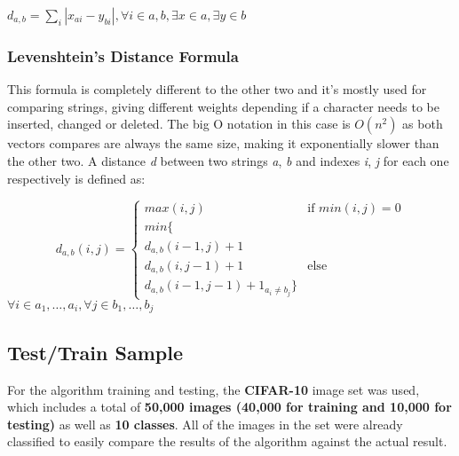 \documentclass[conference,compsoc]{IEEEtran}
\begin{document}
\vspace{3mm}
\(d_{a,b} = \sum_{i} |x_{ai} - y_{bi}|,  \forall i \in a,b, \exists x \in a, \exists y \in b \)

\subsubsection{Levenshtein's Distance Formula}
This formula is completely different to the other two and it's mostly used for comparing strings, giving different weights depending if a character needs to be inserted, changed or deleted. The big O notation in this case is $O(n^2)$ as both vectors compares are always the same size, making it exponentially slower than the other two. A distance \textit{d} between two strings \textit{a}, \textit{b} and indexes \textit{i}, \textit{j} for each one respectively is defined as:


\[ d_{a,b}(i, j) =
  \begin{cases}
    max(i, j)       & \text{if } min(i, j) = 0\\
    min \{ \\ d_{a,b}(i-1, j) + 1 \\  d_{a,b}(i, j-1) + 1 & \text{else} \\ d_{a,b}(i-1, j-1) + 1_{a_i \neq b_j}  \}
  \end{cases}
\]
\(\forall i \in a_1, \dotsc, a_i, \forall j \in b_1, \dotsc, b_j\)

\subsection{Test/Train Sample}
For the algorithm training and testing, the \textbf{CIFAR-10} image set was used, which includes a total of \textbf{50,000 images (40,000 for training and 10,000 for testing)} as well as \textbf{10 classes}. All of the images in the set were already classified to easily compare the results of the algorithm against the actual result.
\end{document}
